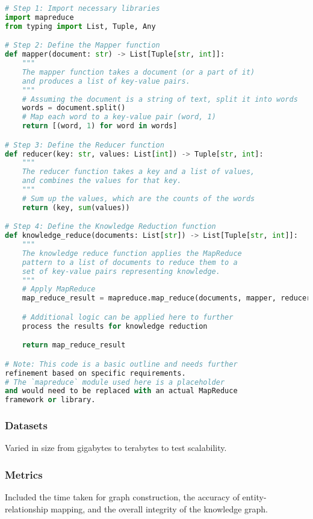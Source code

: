 \documentclass{article}
\begin{document}
\begin{lstlisting}[language=Python]
# Step 1: Import necessary libraries
import mapreduce
from typing import List, Tuple, Any

# Step 2: Define the Mapper function
def mapper(document: str) -> List[Tuple[str, int]]:
    """
    The mapper function takes a document (or a part of it) 
    and produces a list of key-value pairs.
    """
    # Assuming the document is a string of text, split it into words
    words = document.split()
    # Map each word to a key-value pair (word, 1)
    return [(word, 1) for word in words]

# Step 3: Define the Reducer function
def reducer(key: str, values: List[int]) -> Tuple[str, int]:
    """
    The reducer function takes a key and a list of values, 
    and combines the values for that key.
    """
    # Sum up the values, which are the counts of the words
    return (key, sum(values))

# Step 4: Define the Knowledge Reduction function
def knowledge_reduce(documents: List[str]) -> List[Tuple[str, int]]:
    """
    The knowledge reduce function applies the MapReduce 
    pattern to a list of documents to reduce them to a 
    set of key-value pairs representing knowledge.
    """
    # Apply MapReduce
    map_reduce_result = mapreduce.map_reduce(documents, mapper, reducer)

    # Additional logic can be applied here to further 
    process the results for knowledge reduction

    return map_reduce_result

# Note: This code is a basic outline and needs further 
refinement based on specific requirements.
# The `mapreduce` module used here is a placeholder 
and would need to be replaced with an actual MapReduce 
framework or library.

\end{lstlisting}

\subsubsection{Datasets}
Varied in size from gigabytes to terabytes to test scalability.

\subsubsection{Metrics}
Included the time taken for graph construction, the accuracy of entity-relationship mapping, and the overall integrity of the knowledge graph.
\end{document}
